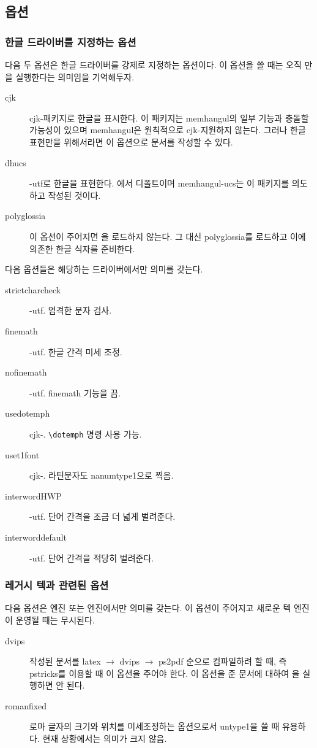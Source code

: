 \documentclass[
	12pt,
	a4paper,
	kosection,
	footnote,
	nobookmarks,
	microtype,
]{oblivoir}
\newcommand\obclass{ob\-liv\-oir\oblivoirallowbreak}
\begin{document}
\subsection{ 옵션}

\subsubsection{한글 드라이버를 지정하는 옵션}

다음 두 옵션은 한글 드라이버를 강제로 지정하는 옵션이다. 이 옵션을 쓸 때는 오직 만을 
실행한다는 의미임을 기억해두자.
\begin{description}
\item [cjk] cjk-\ko 패키지로 한글을 표시한다. 이 패키지는 memhangul의 일부 기능과 충돌할 가능성이
있으며 memhangul은 원칙적으로 cjk- 지원하지 않는다. 그러나 한글 표현만을 위해서라면 이 옵션으로
문서를 작성할 수 있다.
\item [dhucs] \koTeX-utf로 한글을 표현한다. 에서 디폴트이며 memhangul-ucs는
이 패키지를 의도하고 작성된 것이다.
\item [polyglossia] 이 옵션이 주어지면 \koTeX 을 로드하지 않는다. 그 대신 \textsf{polyglossia}를 로드하고 이에 의존한 한글 식자를 준비한다.
\end{description}

다음 옵션들은 해당하는 드라이버에서만 의미를 갖는다.
\begin{description}
\item [strictcharcheck] \koTeX-utf. 엄격한 문자 검사.
\item [finemath] \koTeX-utf. 한글 간격 미세 조정.
\item [nofinemath] \koTeX-utf. finemath 기능을 끔.
\item [usedotemph] cjk-\ko. \verb|\dotemph| 명령 사용 가능.
\item [uset1font] cjk-\ko. 라틴문자도 nanumtype1으로 찍음.
\item [interwordHWP] \koTeX-utf. 단어 간격을 조금 더 넓게 벌려준다.
\item [interworddefault] \koTeX-utf. 단어 간격을 적당히 벌려준다.
\end{description}

\subsubsection{레거시 텍과 관련된 옵션}

다음 옵션은  엔진 또는  엔진에서만 의미를 갖는다. 이 옵션이 주어지고
새로운 텍 엔진이 운영될 때는 무시된다.
\begin{description}
\item [dvips]  작성된 문서를 latex $\rightarrow$ dvips $\rightarrow$ ps2pdf 순으로
컴파일하려 할 때, 즉 pstricks를 이용할 때 이 옵션을 주어야 한다. 이 옵션을 준 문서에 대하여 을 
실행하면 안 된다.
\item [romanfixed] 로마 글자의 크기와 위치를 미세조정하는 옵션으로서 untype1을 쓸 때 유용하다. 현재 상황에서는 의미가 크지 않음.
\end{description}
\end{document}
